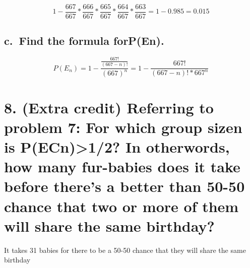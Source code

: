 \documentclass[
]{article}
\begin{document}
\[
1-\frac{667}{667}*\frac{666}{667}*\frac{665}{667}*\frac{664}{667}*\frac{663}{667}=1-0.985 = 0.015
\]

\hypertarget{c.-find-the-formula-forpen.}{%
\subsection{c.~Find the formula
forP(En).}\label{c.-find-the-formula-forpen.}}

\[
P(E_n) = 1-\frac{\frac{667!}{(667-n)!}}{(667)^n} = 1-\frac{667!}{(667-n)!*667^n}
\]

\hypertarget{extra-credit-referring-to-problem-7-for-which-group-sizen-is-pecn12-in-otherwords-how-many-fur-babies-does-it-take-before-theres-a-better-than-50-50-chance-that-two-or-more-of-them-will-share-the-same-birthday}{%
\section{8. (Extra credit) Referring to problem 7: For which group sizen
is P(ECn)\textgreater1/2? In otherwords, how many fur-babies does it
take before there's a better than 50-50 chance that two or more of them
will share the same
birthday?}\label{extra-credit-referring-to-problem-7-for-which-group-sizen-is-pecn12-in-otherwords-how-many-fur-babies-does-it-take-before-theres-a-better-than-50-50-chance-that-two-or-more-of-them-will-share-the-same-birthday}}

It takes 31 babies for there to be a 50-50 chance that they will share
the same birthday
\end{document}
